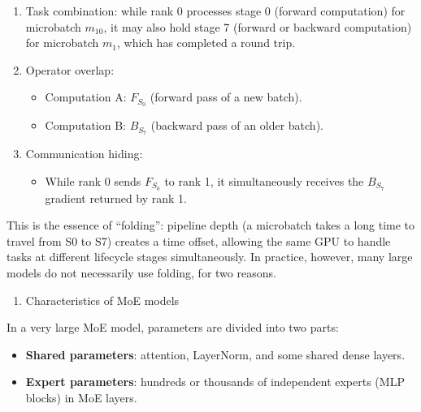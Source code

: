 \begin{enumerate}
\def\labelenumi{\arabic{enumi}.}
\tightlist
\item
  Task combination: while rank 0 processes stage 0 (forward computation) for microbatch \(m_{10}\), it may also hold stage 7 (forward or backward computation) for microbatch \(m_1\), which has completed a round trip.
\item
{}
  Operator overlap:

  \begin{itemize}
  \tightlist
  \item
    Computation A: \(F_{S_0}\) (forward pass of a new batch).
  \item
    Computation B: \(B_{S_7}\) (backward pass of an older batch).
  \end{itemize}
\item
{}
  Communication hiding:

  \begin{itemize}
  \tightlist
  \item
    While rank 0 sends \(F_{S_0}\) to rank 1, it simultaneously receives the \(B_{S_7}\) gradient returned by rank 1.
  \end{itemize}
\end{enumerate}

This is the essence of ``folding'': pipeline depth (a microbatch takes a long time to travel from S0 to S7) creates a time offset, allowing the same GPU to handle tasks at different lifecycle stages simultaneously.
In practice, however, many large models do not necessarily use folding, for two reasons.

\begin{enumerate}
\def\labelenumi{\arabic{enumi}.}
\tightlist
\item
  Characteristics of MoE models
\end{enumerate}

In a very large MoE model, parameters are divided into two parts:

\begin{itemize}
\tightlist
\item
  \textbf{Shared parameters}: attention, LayerNorm, and some shared dense layers.
\item
  \textbf{Expert parameters}: hundreds or thousands of independent experts (MLP blocks) in MoE layers.
\end{itemize}

